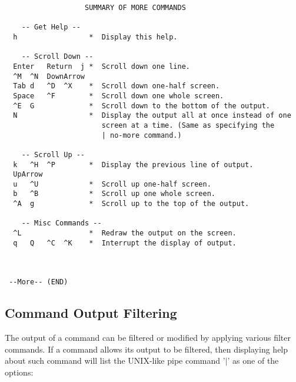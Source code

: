 \begin{verbatim}
                   SUMMARY OF MORE COMMANDS

    -- Get Help --
  h                 *  Display this help.

    -- Scroll Down --
  Enter   Return  j *  Scroll down one line.
  ^M  ^N  DownArrow
  Tab d   ^D  ^X    *  Scroll down one-half screen.
  Space   ^F        *  Scroll down one whole screen.
  ^E  G             *  Scroll down to the bottom of the output.
  N                 *  Display the output all at once instead of one
                       screen at a time. (Same as specifying the
                       | no-more command.)

    -- Scroll Up --
  k   ^H  ^P        *  Display the previous line of output.
  UpArrow
  u   ^U            *  Scroll up one-half screen.
  b   ^B            *  Scroll up one whole screen.
  ^A  g             *  Scroll up to the top of the output.

    -- Misc Commands --
  ^L                *  Redraw the output on the screen.
  q   Q   ^C  ^K    *  Interrupt the display of output.



 --More-- (END)
\end{verbatim}


\newpage
\subsection{Command Output Filtering}

The output of a \xorpsh command can be filtered or modified by applying
various filter commands. If a \xorpsh command allows its output to be
filtered, then displaying help about such command will list the
UNIX-like pipe command '$\mid$' as one of the options:

\vspace{0.1in}

